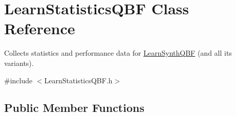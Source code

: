 \hypertarget{classLearnStatisticsQBF}{\section{Learn\-Statistics\-Q\-B\-F Class Reference}
\label{classLearnStatisticsQBF}
}


Collects statistics and performance data for \hyperlink{classLearnSynthQBF}{Learn\-Synth\-Q\-B\-F} (and all its variants).  




{\ttfamily \#include $<$Learn\-Statistics\-Q\-B\-F.\-h$>$}

\subsection*{Public Member Functions}

